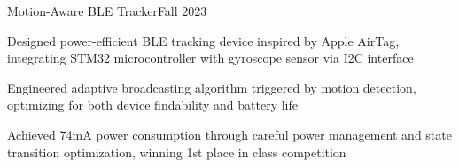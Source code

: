 \begin{joblong}{Motion-Aware BLE Tracker}{Fall 2023}
	\item Designed power-efficient BLE tracking device inspired by Apple AirTag, integrating STM32 microcontroller with gyroscope sensor via I2C interface
	\item Engineered adaptive broadcasting algorithm triggered by motion detection, optimizing for both device findability and battery life
	\item Achieved 74mA power consumption through careful power management and state transition optimization, winning 1st place in class competition
\end{joblong}
